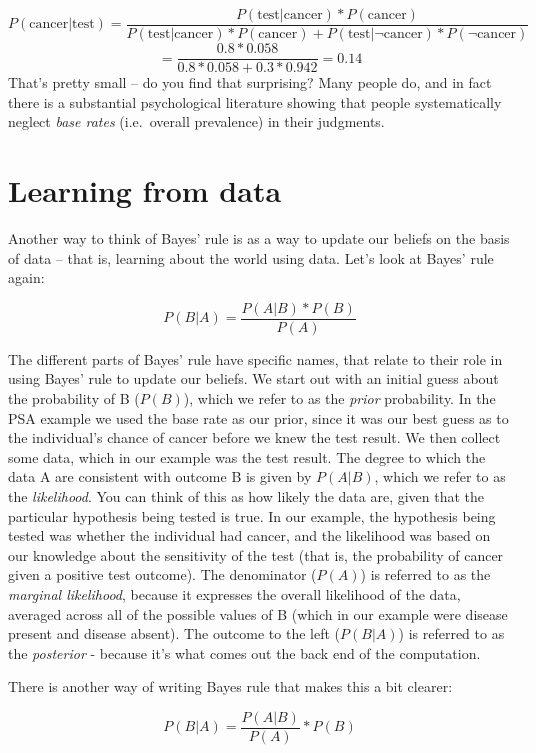 \documentclass[12pt,]{book}
\theoremstyle{definition}
\theoremstyle{definition}
\theoremstyle{definition}
\theoremstyle{remark}
\begin{document}
\[
P(\text{cancer|test}) = \frac{P(\text{test|cancer})*P(\text{cancer})}{P(\text{test|cancer})*P(\text{cancer}) + P(\text{test|}\neg\text{cancer})*P(\neg\text{cancer})} 
\]
\[
= \frac{0.8*0.058}{0.8*0.058 +0.3*0.942 } = 0.14
\]
That's pretty small -- do you find that surprising? Many people do, and in fact there is a substantial psychological literature showing that people systematically neglect \emph{base rates} (i.e.~overall prevalence) in their judgments.

\hypertarget{learning-from-data-1}{%
\section{Learning from data}\label{learning-from-data-1}}

Another way to think of Bayes' rule is as a way to update our beliefs on the basis of data -- that is, learning about the world using data. Let's look at Bayes' rule again:

\[
P(B|A) =  \frac{P(A|B)*P(B)}{P(A)}
\]

The different parts of Bayes' rule have specific names, that relate to their role in using Bayes' rule to update our beliefs. We start out with an initial guess about the probability of B (\(P(B)\)), which we refer to as the \emph{prior} probability. In the PSA example we used the base rate as our prior, since it was our best guess as to the individual's chance of cancer before we knew the test result. We then collect some data, which in our example was the test result. The degree to which the data A are consistent with outcome B is given by \(P(A|B)\), which we refer to as the \emph{likelihood}. You can think of this as how likely the data are, given that the particular hypothesis being tested is true. In our example, the hypothesis being tested was whether the individual had cancer, and the likelihood was based on our knowledge about the sensitivity of the test (that is, the probability of cancer given a positive test outcome). The denominator (\(P(A)\)) is referred to as the \emph{marginal likelihood}, because it expresses the overall likelihood of the data, averaged across all of the possible values of B (which in our example were disease present and disease absent).
The outcome to the left (\(P(B|A)\)) is referred to as the \emph{posterior} - because it's what comes out the back end of the computation.

There is another way of writing Bayes rule that makes this a bit clearer:

\[
P(B|A) = \frac{P(A|B)}{P(A)}*P(B)
\]
\end{document}
